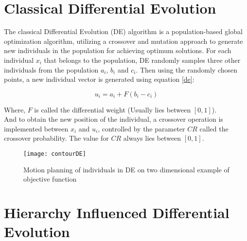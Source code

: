 
\section{Classical Differential Evolution}

The classical Differential Evolution (DE) algorithm is a population-based global optimization algorithm, utilizing a crossover and mutation approach to generate new individuals in the population for achieving optimum solutions\cite{das2011differential}. For each individual $x_i$ that belongs to the population, DE randomly samples three other individuals from the population $a_i$, $b_i$ and $c_i$. Then using the randomly chosen points, a new individual vector is generated using equation \eqref{de}:

\begin{equation}
\label{de}
u_i = a_i + F (b_i - c_i)
\end{equation}

Where, $F$ is called the differential weight (Usually lies between $[0, 1]$).\\
And to obtain the new position of the individual, a crossover operation is implemented between $x_i$ and $u_i$, controlled by the parameter $CR$ called the crossover probability. The value for $CR$ always lies between $[0, 1]$.

\begin{figure}[h!]
  \texttt{[image: contourDE]}
 \caption{Motion planning of individuals in DE on two dimensional example of objective function}
  \label{fig:contourDE}
\end{figure}


\section{Hierarchy Influenced Differential Evolution}

